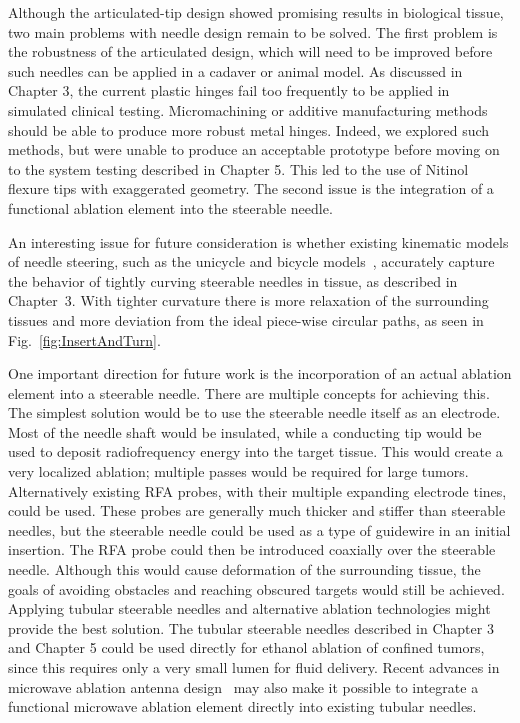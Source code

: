 Although the articulated-tip design showed promising results in biological tissue, two main problems with needle design remain to be solved. The first problem is the robustness of the articulated design, which will need to be improved before such needles can be applied in a cadaver or animal model. As discussed in Chapter 3, the current plastic hinges fail too frequently to be applied in simulated clinical testing. Micromachining or additive manufacturing methods should be able to produce more robust metal hinges. Indeed, we explored such methods, but were unable to produce an acceptable prototype before moving on to the system testing described in Chapter 5. This led to the use of Nitinol flexure tips with exaggerated geometry. The second issue is the integration of a functional ablation element into the steerable needle.

An interesting issue for future consideration is whether existing kinematic models of needle steering, such as the unicycle and bicycle models~\cite{Park2005,Webster2006}, accurately capture the behavior of tightly curving steerable needles in tissue, as described in Chapter~3. With tighter curvature there is more relaxation of the surrounding tissues and more deviation from the ideal piece-wise circular paths, as seen in Fig.~\ref{fig:InsertAndTurn}.

One important direction for future work is the incorporation of an actual ablation element into a steerable needle. There are multiple concepts for achieving this. The simplest solution would be to use the steerable needle itself as an electrode. Most of the needle shaft would be insulated, while a conducting tip would be used to deposit radiofrequency energy into the target tissue. This would create a very localized ablation; multiple passes would be required for large tumors. Alternatively existing RFA probes, with their multiple expanding electrode tines, could be used. These probes are generally much thicker and stiffer than steerable needles, but the steerable needle could be used as a type of guidewire in an initial insertion. The RFA probe could then be introduced coaxially over the steerable needle. Although this would cause deformation of the surrounding tissue, the goals of avoiding obstacles and reaching obscured targets would still be achieved. Applying tubular steerable needles and alternative ablation technologies might provide the best solution. The tubular steerable needles described in Chapter 3 and Chapter 5 could be used directly for ethanol ablation of confined tumors, since this requires only a very small lumen for fluid delivery. Recent advances in microwave ablation antenna design~\cite{Luyen2014,Luyen2015} may also make it possible to integrate a functional microwave ablation element directly into existing tubular needles. 

